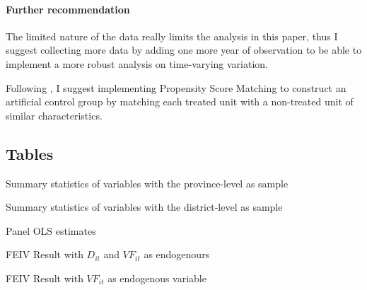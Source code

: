 \documentclass[letterpaper,12pt,leqno]{article}
\newcommand{\bib}{bibliography.bib}
\begin{document}
\paragraph{Further recommendation}
The limited nature of the data really limits the analysis in this paper, thus I suggest collecting more data by adding one more year of observation to be able to implement a more robust analysis on time-varying variation.

Following \citet{abadie2016}, I suggest implementing Propensity Score Matching to construct an artificial control group by matching each treated unit with a non-treated unit of similar characteristics.



\newpage
\appendix
\begin{landscape}
\section{Tables}\label{a:table}

\begin{table}[h]
\caption{Summary statistics of variables with the province-level as sample} 
\scalebox{0.85}{}
\label{t:1}\end{table}


\begin{table}[h]
\caption{Summary statistics of variables with the district-level as sample} 
\scalebox{0.85}{}
\label{t:2}\end{table}

\begin{table}[h]
\caption{Panel OLS estimates} 
\scalebox{0.85}{}
\label{t:pols}\end{table}

\begin{table}[h]
\caption{FEIV Result with $D_{it}$ and $VF_{it}$ as endogenours }
\scalebox{0.8}{}    
\label{t:FEIV}
\end{table}

\begin{table}[h]
\caption{FEIV Result with $VF_{it}$ as endogenous variable}
\scalebox{0.8}{}    
\label{t:FEIV1}
\end{table}


\end{landscape}
\end{document}
